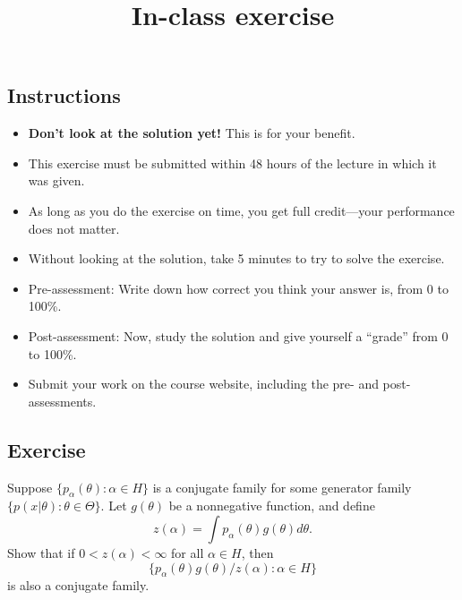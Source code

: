 \documentclass[12pt]{article}
\title{In-class exercise}
\author{}
\date{}
\begin{document}
\maketitle

\subsection*{Instructions}
\begin{itemize}
\item \textbf{Don't look at the solution yet!} This is for your benefit.
\item This exercise must be submitted within 48 hours of the lecture in which it was given. 
\item As long as you do the exercise on time, you get full credit---your performance does not matter.
\item Without looking at the solution, take 5 minutes to try to solve the exercise.
\item Pre-assessment: Write down how correct you think your answer is, from 0 to 100\%.
\item Post-assessment: Now, study the solution and give yourself a ``grade'' from 0 to 100\%.
\item Submit your work on the course website, including the pre- and post- assessments.
\end{itemize}

\subsection*{Exercise}
Suppose $\{p_\alpha(\theta):\alpha\in H\}$ is a conjugate family for some generator family $\{p(x|\theta):\theta\in\Theta\}$.  Let $g(\theta)$ be a nonnegative function, and define
$$z(\alpha) =\int p_\alpha(\theta) g(\theta) d\theta.$$
Show that if $0<z(\alpha)<\infty$ for all $\alpha\in H$, then
$$\big\{p_\alpha(\theta)g(\theta)/z(\alpha) : \alpha\in H\big\}$$
is also a conjugate family.
\end{document}
